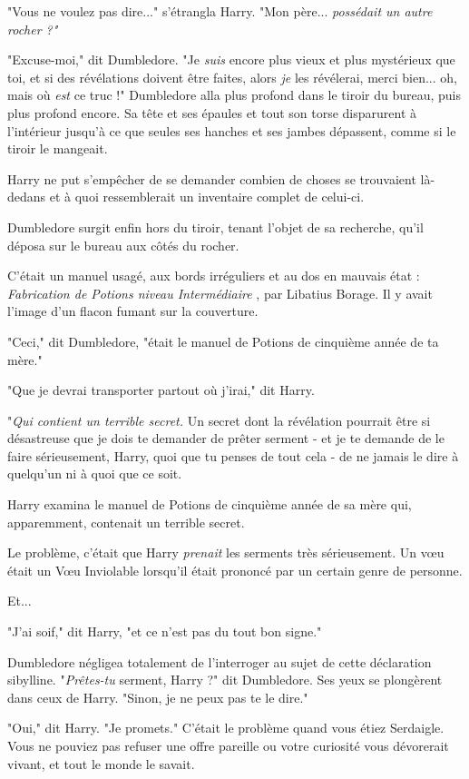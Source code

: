 "Vous ne voulez pas dire..." s'étrangla Harry. "Mon père... \emph{possédait un autre rocher ?"} 

"Excuse-moi," dit Dumbledore. "Je \emph{suis}  encore plus vieux et plus mystérieux que toi, et si des révélations doivent être faites, alors \emph{je } les révélerai, merci bien... oh, mais où \emph{est}  ce truc !" Dumbledore alla plus profond dans le tiroir du bureau, puis plus profond encore. Sa tête et ses épaules et tout son torse disparurent à l'intérieur jusqu'à ce que seules ses hanches et ses jambes dépassent, comme si le tiroir le mangeait.

Harry ne put s'empêcher de se demander combien de choses se trouvaient là-dedans et à quoi ressemblerait un inventaire complet de celui-ci.

Dumbledore surgit enfin hors du tiroir, tenant l'objet de sa recherche, qu'il déposa sur le bureau aux côtés du rocher.

C'était un manuel usagé, aux bords irréguliers et au dos en mauvais état : \emph{Fabrication de Potions niveau Intermédiaire} , par Libatius Borage. Il y avait l'image d'un flacon fumant sur la couverture.

"Ceci," dit Dumbledore, "était le manuel de Potions de cinquième année de ta mère."

"Que je devrai transporter partout où j'irai," dit Harry.

"\emph{Qui contient un terrible secret.}  Un secret dont la révélation pourrait être si désastreuse que je dois te demander de prêter serment - et je te demande de le faire sérieusement, Harry, quoi que tu penses de tout cela - de ne jamais le dire à quelqu'un ni à quoi que ce soit.

Harry examina le manuel de Potions de cinquième année de sa mère qui, apparemment, contenait un terrible secret.

Le problème, c'était que Harry \emph{prenait}  les serments très sérieusement. Un vœu était un Vœu Inviolable lorsqu'il était prononcé par un certain genre de personne.

Et...

"J'ai soif," dit Harry, "et ce n'est pas du tout bon signe."

Dumbledore négligea totalement de l'interroger au sujet de cette déclaration sibylline. "\emph{Prêtes-tu}  serment, Harry ?" dit Dumbledore. Ses yeux se plongèrent dans ceux de Harry. "Sinon, je ne peux pas te le dire."

"Oui," dit Harry. "Je promets." C'était le problème quand vous étiez Serdaigle. Vous ne pouviez pas refuser une offre pareille ou votre curiosité vous dévorerait vivant, et tout le monde le savait.


